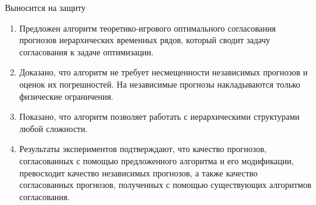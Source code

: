 \documentclass{beamer}
\begin{document}
\begin{frame}{Выносится на защиту}
    \begin{enumerate}
        \item Предложен алгоритм теоретико-игрового оптимального согласования прогнозов
        иерархических временных рядов, который сводит задачу
        согласования к задаче оптимизации.
        \item Доказано, что алгоритм не требует несмещенности независимых
        прогнозов и оценок их погрешностей. На независимые
        прогнозы накладываются только физические ограничения.
        \item Показано, что алгоритм позволяет работать с иерархическими
        структурами любой сложности.
        \item Результаты экспериментов подтверждают, что качество
        прогнозов, согласованных с помощью предложенного алгоритма и его
        модификации, превосходит качество независимых
        прогнозов, а также качество согласованных прогнозов,
        полученных с помощью существующих алгоритмов согласования.
    \end{enumerate}
\end{frame}
\end{document}
